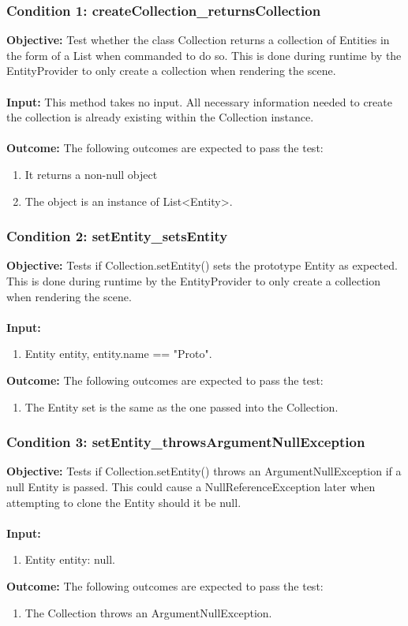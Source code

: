 \documentclass[a4paper,12pt]{article}
\begin{document}
		\subsubsection{Condition 1: createCollection\_returnsCollection}
			\textbf{Objective:} Test whether the class Collection returns a collection of Entities in the form of a List when commanded to do so. This is done during runtime by the EntityProvider to only create a collection when rendering the scene.\\\\
			\textbf{Input:} This method takes no input. All necessary information needed to create the collection is already existing within the Collection instance.\\\\
			\textbf{Outcome:} The following outcomes are expected to pass the test:
				\begin{enumerate}
					\item It returns a non-null object
					\item The object is an instance of List\textless Entity\textgreater .
				\end{enumerate}
		\subsubsection{Condition 2: setEntity\_setsEntity}
			\textbf{Objective:} Tests if Collection.setEntity() sets the prototype Entity as expected. This is done during runtime by the EntityProvider to only create a collection when rendering the scene.\\\\
			\textbf{Input:} 
				\begin{enumerate}
					\item Entity entity, entity.name == "Proto".
				\end{enumerate}
			\textbf{Outcome:} The following outcomes are expected to pass the test:
				\begin{enumerate}
					\item The Entity set is the same as the one passed into the Collection.
				\end{enumerate}
		\subsubsection{Condition 3: setEntity\_throwsArgumentNullException}
			\textbf{Objective:} Tests if Collection.setEntity() throws an ArgumentNullException if a null Entity is passed. This could cause a NullReferenceException later when attempting to clone the Entity should it be null.\\\\
			\textbf{Input:} 
				\begin{enumerate}
					\item Entity entity: null.
				\end{enumerate}
			\textbf{Outcome:} The following outcomes are expected to pass the test:
				\begin{enumerate}
					\item The Collection throws an ArgumentNullException.
				\end{enumerate}
\end{document}

